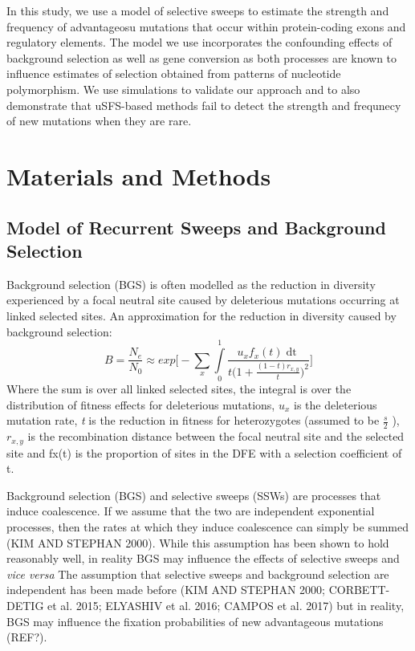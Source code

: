 \documentclass{article}
\begin{document}
In this study, we use a model of selective sweeps to estimate the strength and frequency of advantageosu mutations that occur within protein-coding exons and regulatory elements. The model we use incorporates the confounding effects of background selection as well as gene conversion as both processes are known to influence estimates of selection obtained from patterns of nucleotide polymorphism. We use simulations to validate our approach and to also demonstrate that uSFS-based methods fail to detect the strength and frequnecy of new mutations when they are rare.



\section*{Materials and Methods}

	\subsection*{Model of Recurrent Sweeps and Background Selection}
Background selection (BGS) is often modelled as the reduction in diversity experienced by a focal neutral site caused by deleterious mutations occurring at linked selected sites. An approximation for the reduction in diversity caused by background selection:
\begin{equation}
B = \frac{N_{e}}{N_{0}} \approx exp\Bigg[- \sum \limits_{x} \int \limits_{0}^1 \frac{u_{x}f_x(t)\mathop{dt}}{t \Big( 1 + \frac{(1-t)r_{x,y}}{t} \Big)^2} \Bigg]
\end{equation}
Where the sum is over all linked selected sites, the integral is over the distribution of fitness effects for deleterious mutations, \emph{$u_{x}$} is the deleterious mutation rate, \emph{t} is the reduction in fitness for heterozygotes (assumed to be \(\frac{s}{2}\) ), $r_{x,y}$  is the recombination distance between the focal neutral site and the selected site and fx(t) is the proportion of sites in the DFE with a selection coefficient of t.

	Background selection (BGS) and selective sweeps (SSWs) are processes that induce coalescence. If we assume that the two are independent exponential processes, then the rates at which they induce coalescence can simply be summed (KIM AND STEPHAN 2000). While this assumption has been shown to hold reasonably well, in reality BGS may influence the effects of selective sweeps and \emph{vice versa}
	The assumption that selective sweeps and background selection are independent has been made before (KIM AND STEPHAN 2000; CORBETT-DETIG et al. 2015; ELYASHIV et al. 2016; CAMPOS et al. 2017) but in reality, BGS may influence the fixation probabilities of new advantageous mutations (REF?). 
\end{document}
